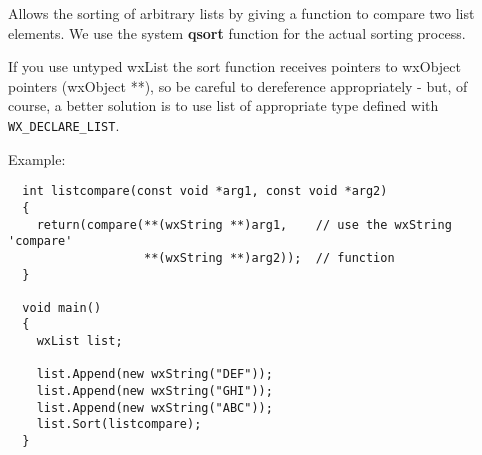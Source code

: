 Allows the sorting of arbitrary lists by giving
a function to compare two list elements. We use the system {\bf qsort} function
for the actual sorting process.

If you use untyped wxList the sort function receives pointers to wxObject
pointers (wxObject **), so be careful to dereference appropriately - but,
of course, a better solution is to use list of appropriate type defined with
{\tt WX\_DECLARE\_LIST}.

Example:

\begin{verbatim}
  int listcompare(const void *arg1, const void *arg2)
  {
    return(compare(**(wxString **)arg1,    // use the wxString 'compare'
                   **(wxString **)arg2));  // function 
  }

  void main()
  {
    wxList list;

    list.Append(new wxString("DEF"));
    list.Append(new wxString("GHI"));
    list.Append(new wxString("ABC"));
    list.Sort(listcompare);
  }
\end{verbatim}


